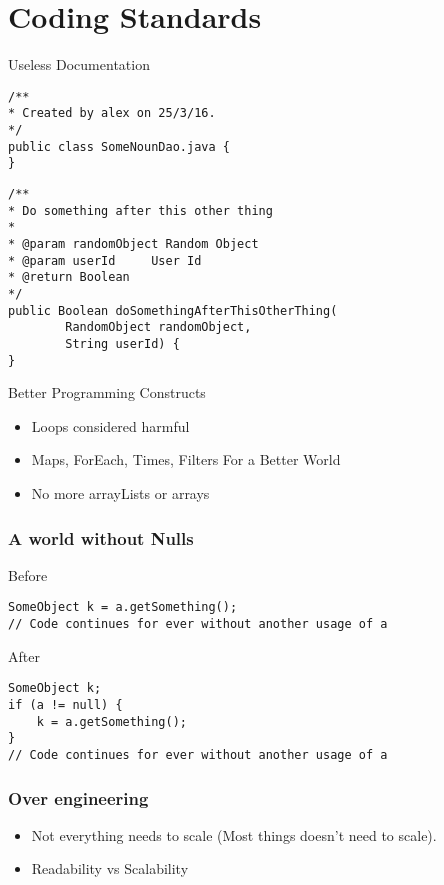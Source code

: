 \section{Coding Standards}

\begin{frame}[fragile]{Useless Documentation}
\footnotesize
\begin{verbatim}
/**
* Created by alex on 25/3/16.
*/
public class SomeNounDao.java {
}
\end{verbatim}
\begin{verbatim}
/**
* Do something after this other thing
*
* @param randomObject Random Object
* @param userId     User Id
* @return Boolean
*/
public Boolean doSomethingAfterThisOtherThing(
        RandomObject randomObject,
        String userId) {
}
\end{verbatim}
\normalsize
\end{frame}

\begin{frame}[fragile]{Better Programming Constructs}
\begin{itemize}
	\item Loops considered harmful
	\item Maps, ForEach, Times, Filters For a Better World
	\item No more arrayLists or arrays
\end{itemize}
\end{frame}

\begin{frame}[fragile]
\frametitle{A world without Nulls}
\footnotesize
Before
\begin{verbatim}
SomeObject k = a.getSomething();
// Code continues for ever without another usage of a
\end{verbatim}
After
\begin{verbatim}
SomeObject k;
if (a != null) {
    k = a.getSomething();
}
// Code continues for ever without another usage of a
\end{verbatim}
\normalsize
\end{frame}

\begin{frame}[fragile]
\frametitle{Over engineering}
\begin{itemize}
	\item Not everything needs to scale (Most things doesn't need to scale).
	\item Readability vs Scalability
\end{itemize}
\end{frame}

